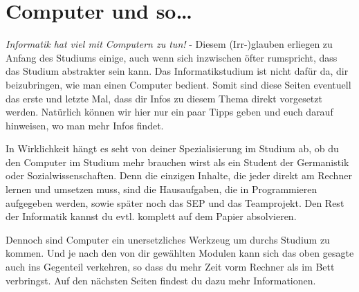 \section{Computer und so\ldots}
	\label{computer}

\begin{multicols}{2}
	\emph{Informatik hat viel mit Computern zu tun!} - Diesem (Irr-)glauben erliegen zu Anfang des Studiums einige, auch wenn sich inzwischen öfter rumspricht, dass das Studium abstrakter sein kann. Das Informatikstudium ist nicht dafür da,  dir beizubringen, wie man einen Computer bedient. Somit sind diese Seiten eventuell das erste und letzte Mal,  dass dir Infos zu diesem Thema direkt vorgesetzt werden. Natürlich können wir hier nur ein paar Tipps geben und euch darauf hinweisen, wo man mehr Infos  findet.

	In Wirklichkeit hängt es seht von deiner Spezialisierung im Studium ab, ob  du den Computer im Studium mehr brauchen wirst als ein Student der Germanistik oder Sozialwissenschaften. Denn die einzigen Inhalte,  die jeder direkt am Rechner lernen und umsetzen muss, sind die Hausaufgaben,  die in Programmieren aufgegeben werden, sowie später noch das SEP und das Teamprojekt. Den Rest der Informatik kannst du evtl. komplett auf dem Papier absolvieren.

	Dennoch sind Computer ein unersetzliches Werkzeug um durchs
	Studium zu kommen. Und je nach den von dir gewählten Modulen
	kann sich das oben gesagte auch ins Gegenteil verkehren, so dass
	du mehr Zeit vorm Rechner als im Bett verbringst. Auf den
	nächsten Seiten findest du dazu mehr Informationen.






\end{multicols}

